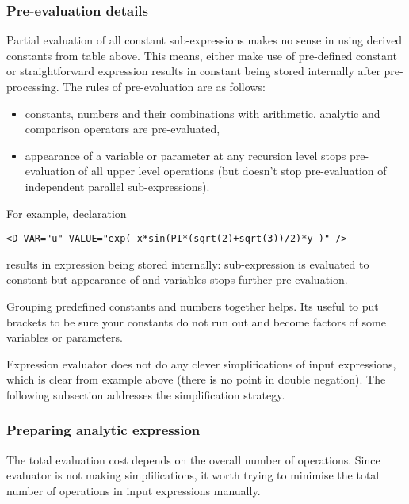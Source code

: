 \subsubsection{Pre-evaluation details}
Partial evaluation of all constant sub-expressions makes no sense in using
derived constants from table above. This means, either make use of pre-defined
constant  or straightforward expression 
results in constant  being stored internally
after pre-processing. The rules of pre-evaluation are as follows:
\begin{itemize}
\item constants, numbers and their combinations with arithmetic, analytic and
 comparison operators are pre-evaluated,
\item appearance of a variable or parameter
 at any recursion level stops pre-evaluation of all upper level operations (but
 doesn't stop pre-evaluation of independent parallel sub-expressions).
\end{itemize}

For example, declaration 
\begin{lstlisting}[style=XMLStyle]
     <D VAR="u" VALUE="exp(-x*sin(PI*(sqrt(2)+sqrt(3))/2)*y )" />
\end{lstlisting}
results in expression  being
stored internally: sub-expression  is
evaluated to constant but appearance of  and  variables
stops further pre-evaluation.

Grouping predefined constants and numbers together helps. Its useful to put
brackets to be sure your constants do not run out and become factors of some
variables or parameters.

Expression evaluator does not do any clever simplifications of input
expressions, which is clear from example above (there is no point in double
negation). The following subsection addresses the simplification strategy.

\subsubsection{Preparing analytic expression}

The total evaluation cost depends on the overall number of operations. Since
evaluator is not making simplifications, it worth trying to minimise the total
number of operations in input expressions manually.

